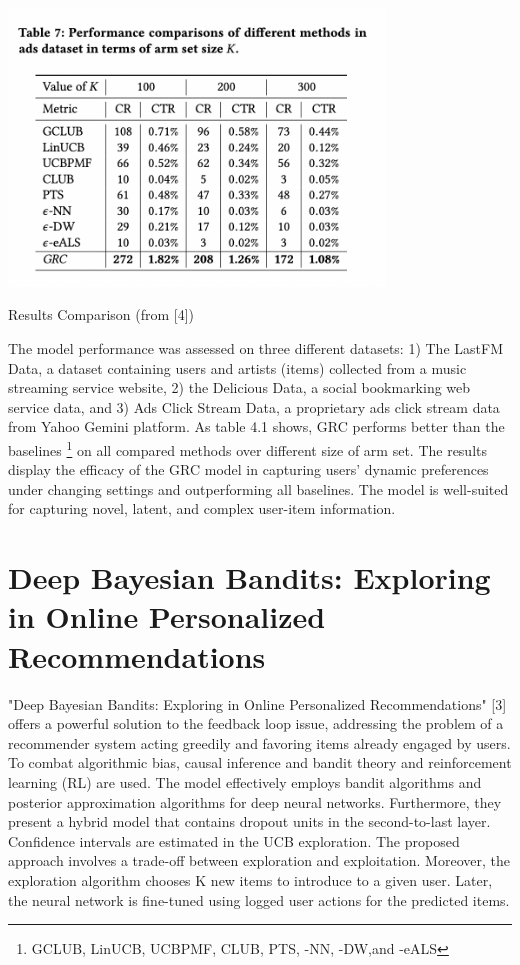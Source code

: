 \begin{table}[hh!]
    \centering
    \includegraphics[width=100mm]{results_GRC.png}
    \caption{Results Comparison (from [4])
    \label{overflow}}
\end{table}
The model performance was assessed on three different datasets: 1) The LastFM Data, a dataset containing  users and artists (items) collected from a music streaming service website, 2) the Delicious Data, a social bookmarking web service data, and 3) Ads Click Stream Data, a proprietary ads click stream data from Yahoo Gemini platform. As table 4.1 shows, GRC performs better than the baselines \footnote {GCLUB, LinUCB, UCBPMF, CLUB, PTS, \textepsilon-NN, \textepsilon-DW,and \textepsilon-eALS} on all compared methods over different size of arm set. The results display the efficacy of the GRC model in capturing users’ dynamic preferences under changing settings and outperforming all baselines. The model is well-suited for capturing novel, latent, and complex user-item information.

\section{Deep Bayesian Bandits: Exploring in Online Personalized
Recommendations}
"Deep Bayesian Bandits: Exploring in  Online Personalized Recommendations" [3] offers a powerful solution to the feedback loop issue, addressing the problem of a recommender system acting greedily and favoring items already engaged by users. To combat algorithmic bias, causal inference and bandit theory and reinforcement learning (RL) are used. The model effectively employs bandit algorithms and posterior approximation algorithms for deep neural networks. Furthermore, they present a hybrid model that contains dropout units in the second-to-last layer. Confidence intervals are estimated in the UCB exploration. The proposed approach involves a trade-off between exploration and exploitation. Moreover, the exploration algorithm chooses K new items to introduce to a given user. Later, the neural network is fine-tuned using logged user actions for the predicted items. 

